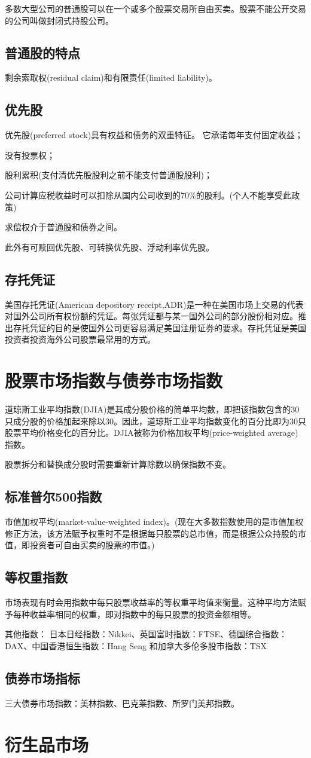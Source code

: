 \documentclass{article}
\begin{document}
多数大型公司的普通股可以在一个或多个股票交易所自由买卖。股票不能公开交易的公司叫做封闭式持股公司。

\subsection{普通股的特点}
剩余索取权(residual claim)和有限责任(limited liability)。

\subsection{优先股}
优先股(preferred stock)具有权益和债务的双重特征。
它承诺每年支付固定收益；

没有投票权；

股利累积(支付清优先股股利之前不能支付普通股股利)；

公司计算应税收益时可以扣除从国内公司收到的70\%的股利。(个人不能享受此政策)

求偿权介于普通股和债券之间。

\hspace*{\fill}

此外有可赎回优先股、可转换优先股、浮动利率优先股。

\subsection{存托凭证}
美国存托凭证(American depository receipt,ADR)是一种在美国市场上交易的代表对国外公司所有权份额的凭证。每张凭证都与某一国外公司的部分股份相对应。推出存托凭证的目的是使国外公司更容易满足美国注册证券的要求。存托凭证是美国投资者投资海外公司股票最常用的方式。

\section{股票市场指数与债券市场指数}
道琼斯工业平均指数(DJIA)是其成分股价格的简单平均数，即把该指数包含的30只成分股的价格加起来除以30。因此，道琼斯工业平均指数变化的百分比即为30只股票平均价格变化的百分比。DJIA被称为价格加权平均(price-weighted average)指数。

股票拆分和替换成分股时需要重新计算除数以确保指数不变。

\subsection{标准普尔500指数}
市值加权平均(market-value-weighted index)。(现在大多数指数使用的是市值加权修正方法，该方法赋予权重时不是根据每只股票的总市值，而是根据公众持股的市值，即投资者可自由买卖的股票的市值。)

\subsection{等权重指数}
市场表现有时会用指数中每只股票收益率的等权重平均值来衡量。这种平均方法赋予每种收益率相同的权重，即对指数中的每只股票的投资金额相等。

其他指数：
日本日经指数：Nikkei、英国富时指数：FTSE、德国综合指数：DAX、中国香港恒生指数：Hang Seng 和加拿大多伦多股市指数：TSX

\subsection{债券市场指标}
三大债券市场指数：美林指数、巴克莱指数、所罗门美邦指数。


\section{衍生品市场}
\end{document}
